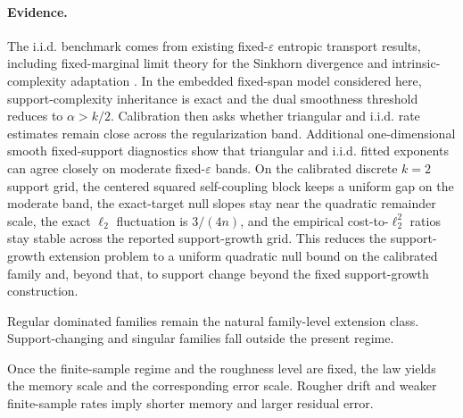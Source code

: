 \paragraph{Evidence.}
The i.i.d. benchmark comes from existing fixed-$\varepsilon$ entropic transport
results, including fixed-marginal limit theory for the Sinkhorn divergence and
intrinsic-complexity adaptation \citep{GoldfeldEtAl2022,Stromme2023MID,
GroppeHundrieser2024LCA}. In the embedded fixed-span model considered here,
support-complexity inheritance is exact and the dual smoothness threshold
reduces to $\alpha>k/2$. Calibration then asks whether triangular and i.i.d.
rate estimates remain close across the regularization band. Additional
one-dimensional smooth fixed-support diagnostics show that triangular and i.i.d.
fitted exponents can agree closely on moderate fixed-$\varepsilon$ bands.
On the calibrated discrete $k=2$ support grid, the centered squared
self-coupling block keeps a uniform gap on the moderate band, the exact-target
null slopes stay near the quadratic remainder scale, the exact
$\ell_2$ fluctuation is $3/(4n)$, and the empirical cost-to-$\ell_2^2$ ratios
stay stable across the reported support-growth grid. This reduces the support-
growth extension problem to a uniform quadratic null bound on the calibrated
family and, beyond that, to support change beyond the fixed support-growth
construction.

Regular dominated families remain the natural family-level extension class.
Support-changing and singular families fall outside the present regime.

Once the finite-sample regime and the roughness level are fixed, the law yields
the memory scale and the corresponding error scale. Rougher drift and weaker
finite-sample rates imply shorter memory and larger residual error.
